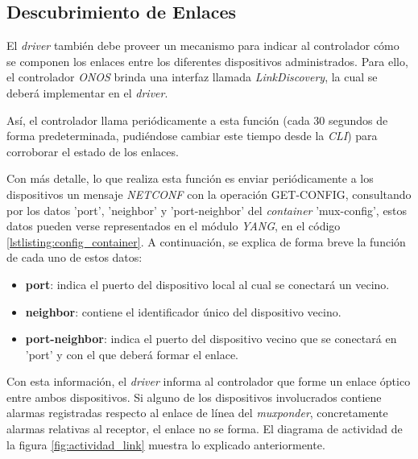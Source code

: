 \subsection{Descubrimiento de Enlaces} \label{driverlink}

El \textit{driver} también debe proveer un mecanismo para indicar al controlador cómo se componen los enlaces entre los diferentes dispositivos administrados. Para ello, el controlador \textit{ONOS} brinda una interfaz llamada \textit{LinkDiscovery}, la cual se deberá implementar en el \textit{driver}. 

Así, el controlador llama periódicamente a esta función (cada 30 segundos de forma predeterminada, pudiéndose cambiar este tiempo desde la \textit{CLI}) para corroborar el estado de los enlaces. 

Con más detalle, lo que realiza esta función es enviar periódicamente a los dispositivos un mensaje \textit{NETCONF} con la operación GET-CONFIG, consultando por los datos 'port', 'neighbor' y 'port-neighbor' del \textit{container} 'mux-config', estos datos pueden verse representados en el módulo \textit{YANG}, en el código \ref{lstlisting:config_container}. A continuación, se explica de forma breve la función de cada uno de estos datos:

\begin{itemize}
	\item \textbf{port}: indica el puerto del dispositivo local al cual se conectará un vecino.
    
    \item \textbf{neighbor}: contiene el identificador único del dispositivo vecino.
    
    \item \textbf{port-neighbor}: indica el puerto del dispositivo vecino que se conectará en 'port' y con el que deberá formar el enlace.
\end{itemize}

Con esta información, el \textit{driver} informa al controlador que forme un enlace óptico entre ambos dispositivos. Si alguno de los dispositivos involucrados contiene alarmas registradas respecto al enlace de línea del \textit{muxponder}, concretamente alarmas relativas al receptor, el enlace no se forma. El diagrama de actividad de la figura \ref{fig:actividad_link} muestra lo explicado anteriormente.

